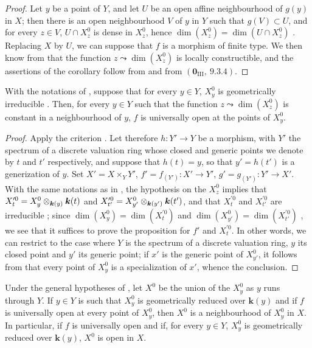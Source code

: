 \begin{proof}
Let $y$ be a point of $Y$, and let $U$ be an open affine neighbourhood of $g(y)$ in $X$; then there is an open neighbourhood $V$ of $y$ in $Y$ such that $g(V)\subset U$, and for every $z\in V$, $U\cap X_z^0$ is dense in $X_z^0$, hence $\dim(X_z^0)=\dim(U\cap X_z^0)$ .
Replacing $X$ by $U$, we can suppose that $f$ is a morphism of finite type.
We then know from  that the function $z\leadsto\dim(X_z^0)$ is locally constructible, and the assertions of the corollary follow from  and from $(\mathbf{0}_{\mathrm{III}},~9.3.4)$.
\end{proof}

\begin{proposition}[15.6.3]
\label{IV.15.6.3}
With the notations of , suppose that for every $y\in Y$, $X_y^0$ is geometrically irreducible .
Then, for every $y\in Y$ such that the function $z\leadsto\dim(X_z^0)$ is constant in a neighbourhood of $y$, $f$ is universally open at the points of $X_y^0$.
\end{proposition}

\begin{proof}
Apply the criterion .
Let therefore $h:Y'\to Y$ be a morphism, with $Y'$ the spectrum of a discrete valuation ring whose closed and generic points we denote by $t$ and $t'$ respectively, and suppose that $h(t)=y$, so that $y'=h(t')$ is a generization of $y$.
Set $X'=X\times_Y Y'$, $f'=f_{(Y')}:X'\to Y'$, $g'=g_{(Y')}:Y'\to X'$.
With the same notations as in , the hypothesis on the $X_z^0$ implies that $X_t^{\prime 0}=X_y^0\otimes_{\boldsymbol{k}(y)}\boldsymbol{k}(t)$ and $X_{t'}^{\prime 0}=X_{y'}^0\otimes_{\boldsymbol{k}(y')}\boldsymbol{k}(t')$, and that $X_t^{\prime 0}$ and $X_{t'}^{\prime 0}$ are irreducible ; since $\dim(X_y^0)=\dim(X_t^{\prime 0})$ and $\dim(X_{y'}^0)=\dim(X_{t'}^{\prime 0})$ , we see that it suffices to prove the proposition for $f'$ and $X_t^{\prime 0}$. In other words, we can restrict to the case where $Y$ is the spectrum of a discrete valuation ring, $y$ its closed point and $y'$ its generic point; if $x'$ is the generic point of $X_{y'}^0$, it follows from  that every point of $X_y^0$ is a specialization of $x'$, whence the conclusion.
\end{proof}

\begin{proposition}[15.6.4]
\label{IV.15.6.4}
Under the general hypotheses of , let $X^0$ be the union of the $X_y^0$ as $y$ runs through $Y$.
If $y\in Y$ is such that $X_y^0$ is geometrically reduced over $\boldsymbol{k}(y)$  and if $f$ is universally open at every point of $X_y^0$, then $X^0$ is a neighbourhood of $X_y^0$ in $X$.
In particular, if $f$ is universally open and if, for every $y\in Y$, $X_y^0$ is geometrically reduced over $\boldsymbol{k}(y)$, $X^0$ is open in $X$.
\end{proposition}

